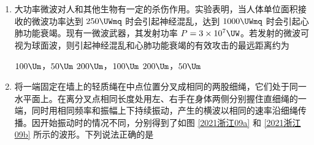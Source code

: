\documentclass[\gkver]{gaokaozhenti}
\begin{document}
\begin{enumerate}

\item
大功率微波对人和其他生物有一定的杀伤作用。实验表明，当人体单位面积接收的微波功率达到 $250\UWmq$ 时会引起神经混乱，达到 $1000\UWmq$ 时会引起心肺功能衰竭。现有一微波武器，其发射功率 $P=3\times10^{7}\UW$。若发射的微波可视为球面波，则引起神经混乱和心肺功能衰竭的有效攻击的最远距离约为

{$100\Um$，$50\Um$}
{$200\Um$，$100\Um$}
{$200\Um$，$50\Um$}


\item
将一端固定在墙上的轻质绳在中点位置分叉成相同的两股细绳，它们处于同一水平面上。在离分叉点相同长度处用左、右手在身体两侧分别握住直细绳的一端，同时用相同频率和振幅上下持续振动，产生的横波以相同的速率沿细绳传播。因开始振动时的情况不同，分别得到了如图 \ref{2021浙江09a} 和 \ref{2021浙江09b} 所示的波形。下列说法正确的是


\end{enumerate}
\end{document}
